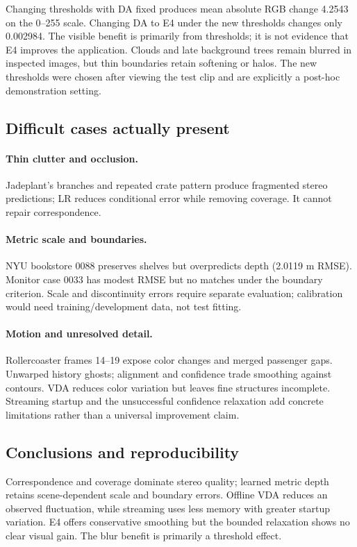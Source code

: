 \documentclass[10pt,twocolumn,letterpaper]{article}
\begin{document}
Changing thresholds with DA fixed produces mean absolute RGB change 4.2543 on the 0--255 scale. Changing DA to E4 under the new thresholds changes only 0.002984. The visible benefit is primarily from thresholds; it is not evidence that E4 improves the application. Clouds and late background trees remain blurred in inspected images, but thin boundaries retain softening or halos. The new thresholds were chosen after viewing the test clip and are explicitly a post-hoc demonstration setting.

\subsection{Difficult cases actually present}
\paragraph{Thin clutter and occlusion.}
Jadeplant's branches and repeated crate pattern produce fragmented stereo predictions; LR reduces conditional error while removing coverage. It cannot repair correspondence.

\paragraph{Metric scale and boundaries.}
NYU bookstore 0088 preserves shelves but overpredicts depth (2.0119 m RMSE). Monitor case 0033 has modest RMSE but no matches under the boundary criterion. Scale and discontinuity errors require separate evaluation; calibration would need training/development data, not test fitting.

\paragraph{Motion and unresolved detail.}
Rollercoaster frames 14--19 expose color changes and merged passenger gaps. Unwarped history ghosts; alignment and confidence trade smoothing against contours. VDA reduces color variation but leaves fine structures incomplete. Streaming startup and the unsuccessful confidence relaxation add concrete limitations rather than a universal improvement claim.

\subsection{Conclusions and reproducibility}
Correspondence and coverage dominate stereo quality; learned metric depth retains scene-dependent scale and boundary errors. Offline VDA reduces an observed fluctuation, while streaming uses less memory with greater startup variation. E4 offers conservative smoothing but the bounded relaxation shows no clear visual gain. The blur benefit is primarily a threshold effect.
\end{document}
